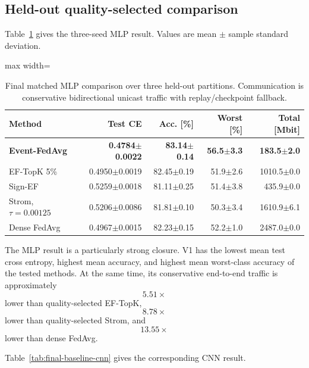 \subsection{Held-out quality-selected comparison}

Table~\ref{tab:final-baseline-mlp} gives the three-seed MLP result. Values are mean $\pm$ sample standard deviation.

\begin{table}[ht]
\centering
\small
\caption{Final matched MLP comparison over three held-out partitions. Communication is conservative bidirectional unicast traffic with replay/checkpoint fallback.}
\label{tab:final-baseline-mlp}
\begin{adjustbox}{max width=\textwidth}
\begin{tabular}{lrrrr}
\toprule
Method & Test CE & Acc. [\%] & Worst [\%] & Total [Mbit]\\
\midrule
\textbf{Event-FedAvg} & \textbf{0.4784$\pm$0.0022} & \textbf{83.14$\pm$0.14} & \textbf{56.5$\pm$3.3} & \textbf{183.5$\pm$2.0}\\
EF-TopK 5\% & 0.4950$\pm$0.0019 & 82.45$\pm$0.19 & 51.9$\pm$2.6 & 1010.5$\pm$0.0\\
Sign-EF & 0.5259$\pm$0.0018 & 81.11$\pm$0.25 & 51.4$\pm$3.8 & 435.9$\pm$0.0\\
Strom, $\tau=0.00125$ & 0.5206$\pm$0.0086 & 81.81$\pm$0.10 & 50.3$\pm$3.4 & 1610.9$\pm$6.1\\
Dense FedAvg & 0.4967$\pm$0.0015 & 82.23$\pm$0.15 & 52.2$\pm$1.0 & 2487.0$\pm$0.0\\
\bottomrule
\end{tabular}
\end{adjustbox}
\end{table}

The MLP result is a particularly strong closure. V1 has the lowest mean test cross entropy, highest mean accuracy, and highest mean worst-class accuracy of the tested methods. At the same time, its conservative end-to-end traffic is approximately
\begin{equation}
    5.51\times
\end{equation}
lower than quality-selected EF-TopK,
\begin{equation}
    8.78\times
\end{equation}
lower than quality-selected Strom, and
\begin{equation}
    13.55\times
\end{equation}
lower than dense FedAvg.

Table~\ref{tab:final-baseline-cnn} gives the corresponding CNN result.

